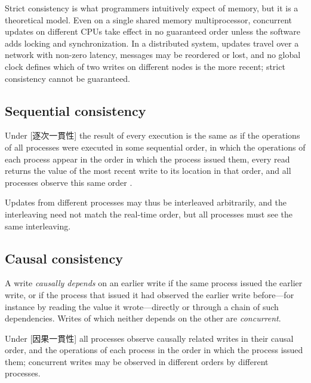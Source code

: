\documentclass[../main.tex]{subfiles}
\begin{document}
Strict consistency is what programmers intuitively expect of memory, but it
is a theoretical model.  Even on a single shared memory multiprocessor,
concurrent updates on different CPUs take effect in no guaranteed order
unless the software adds locking and synchronization.  In a distributed
system, updates travel over a network with non-zero latency, messages may
be reordered or lost, and no global clock defines which of two writes on
different nodes is the more recent; strict consistency cannot be
guaranteed.

\subsection{Sequential consistency}

\begin{definition}
  Under [逐次一貫性] the result of every
  execution is the same as if the operations of all processes were executed
  in some sequential order, in which the operations of each process appear
  in the order in which the process issued them, every read returns the
  value of the most recent write to its location in that order, and all processes observe this same
  order \cite{lamport1979}.
\end{definition}

Updates from different processes may thus be interleaved arbitrarily, and
the interleaving need not match the real-time order, but all processes
must see the same interleaving.

\subsection{Causal consistency}

A write \emph{causally depends} on an earlier write if the same process
issued the earlier write, or if the process that issued it had observed the
earlier write before---for instance by reading the value it wrote---directly
or through a chain of such dependencies.
Writes of which neither depends on the other are \emph{concurrent}.

\begin{definition}
  Under [因果一貫性] all processes observe causally
  related writes in their causal order, and the operations of each process
  in the order in which the process issued them; concurrent writes may be
  observed in different orders by different processes.
\end{definition}
\end{document}
